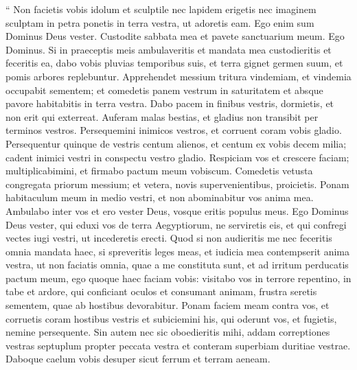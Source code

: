 \begin{biblechapter}
\begin{biblechapter}
\begin{biblechapter}
\begin{biblechapter}
\begin{biblechapter}
\begin{biblechapter}
\begin{biblechapter}
\begin{biblechapter}
\begin{biblechapter}
\begin{biblechapter}
\begin{biblechapter}
\begin{biblechapter}
\begin{biblechapter}
\begin{biblechapter}
\begin{biblechapter}
\begin{biblechapter}
\begin{biblechapter}
\begin{biblechapter}
\begin{biblechapter}
\begin{biblechapter}
\begin{biblechapter}
\begin{biblechapter}
\begin{biblechapter}
\begin{biblechapter}
\begin{biblechapter}
\begin{biblechapter}
\verse “ Non facietis vobis idolum et sculptile nec lapidem erigetis nec imaginem sculptam in petra ponetis in terra vestra, ut adoretis eam. Ego enim sum Dominus Deus vester. 
\verse Custodite sabbata mea et pavete sanctuarium meum. Ego Dominus.
 \verse Si in praeceptis meis ambulaveritis et mandata mea custodieritis et feceritis ea, 
\verse dabo vobis pluvias temporibus suis, et terra gignet germen suum, et pomis arbores replebuntur. 
\verse Apprehendet messium tritura vindemiam, et vindemia occupabit sementem; et comedetis panem vestrum in saturitatem et absque pavore habitabitis in terra vestra. 
\verse Dabo pacem in finibus vestris, dormietis, et non erit qui exterreat. Auferam malas bestias, et gladius non transibit per terminos vestros. 
\verse Persequemini inimicos vestros, et corruent coram vobis gladio. 
\verse Persequentur quinque de vestris centum alienos, et centum ex vobis decem milia; cadent inimici vestri in conspectu vestro gladio.
 \verse Respiciam vos et crescere faciam; multiplicabimini, et firmabo pactum meum vobiscum.
 \verse Comedetis vetusta congregata priorum messium; et vetera, novis supervenientibus, proicietis.
 \verse Ponam habitaculum meum in medio vestri, et non abominabitur vos anima mea. 
 \verse Ambulabo inter vos et ero vester Deus, vosque eritis populus meus. 
\verse Ego Dominus Deus vester, qui eduxi vos de terra Aegyptiorum, ne serviretis eis, et qui confregi vectes iugi vestri, ut incederetis erecti.
 \verse Quod si non audieritis me nec feceritis omnia mandata haec, 
\verse si spreveritis leges meas, et iudicia mea contempserit anima vestra, ut non faciatis omnia, quae a me constituta sunt, et ad irritum perducatis pactum meum, 
 \verse ego quoque haec faciam vobis: visitabo vos in terrore repentino, in tabe et ardore, qui conficiant oculos et consumant animam, frustra seretis sementem, quae ab hostibus devorabitur. 
\verse Ponam faciem meam contra vos, et corruetis coram hostibus vestris et subiciemini his, qui oderunt vos, et fugietis, nemine persequente.
 \verse Sin autem nec sic oboedieritis mihi, addam correptiones vestras septuplum propter peccata vestra 
\verse et conteram superbiam duritiae vestrae. Daboque caelum vobis desuper sicut ferrum et terram aeneam. 

\end{biblechapter}
\end{biblechapter}
\end{biblechapter}
\end{biblechapter}
\end{biblechapter}
\end{biblechapter}
\end{biblechapter}
\end{biblechapter}
\end{biblechapter}
\end{biblechapter}
\end{biblechapter}
\end{biblechapter}
\end{biblechapter}
\end{biblechapter}
\end{biblechapter}
\end{biblechapter}
\end{biblechapter}
\end{biblechapter}
\end{biblechapter}
\end{biblechapter}
\end{biblechapter}
\end{biblechapter}
\end{biblechapter}
\end{biblechapter}
\end{biblechapter}
\end{biblechapter}
